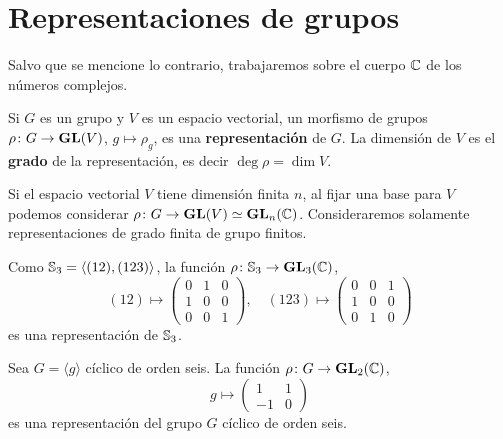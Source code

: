 \chapter{Representaciones de grupos}

Salvo que se mencione lo contrario, trabajaremos sobre el cuerpo $\mathbb{C}$ de los números complejos. 

\begin{definition}
Si $G$ es un grupo y $V$ es un espacio vectorial, 
un morfismo de grupos $\rho\colon G\to\mathbf{GL}(V)$, $g\mapsto\rho_g$, es una 
\textbf{representación} de $G$. La dimensión de $V$ es el \textbf{grado} 
de la representación, es decir $\deg\rho=\dim V$. 
\end{definition}

Si el espacio vectorial $V$ tiene dimensión finita $n$, al fijar una base 
para $V$ podemos considerar $\rho\colon G\to\mathbf{GL}(V)\simeq\mathbf{GL}_n(\mathbb{C})$. Consideraremos 
solamente representaciones de grado finita de grupo finitos.
 
\begin{example}
Como $\mathbb{S}_3=\langle (12),(123)\rangle$, la función $\rho\colon \mathbb{S}_3\to\mathbf{GL}_3(\mathbb{C})$,
\[
(12)\mapsto\begin{pmatrix}
0 & 1 & 0\\
1 & 0 & 0\\
0 & 0 & 1
\end{pmatrix},\quad
(123)\mapsto\begin{pmatrix}
0 & 0 & 1\\
1 & 0 & 0\\
0 & 1 & 0
\end{pmatrix}
\] 
es una representación de $\mathbb{S}_3$. 
\end{example}


\begin{example}
Sea $G=\langle g\rangle$ cíclico de orden seis. 
La función $\rho\colon G\to\mathbf{GL}_2(\mathbb{C})$, 
\[
g\mapsto
\begin{pmatrix}
1&1\\
-1&0
\end{pmatrix}
\] 
es una representación del grupo $G$ cíclico de orden seis. 
\end{example}

